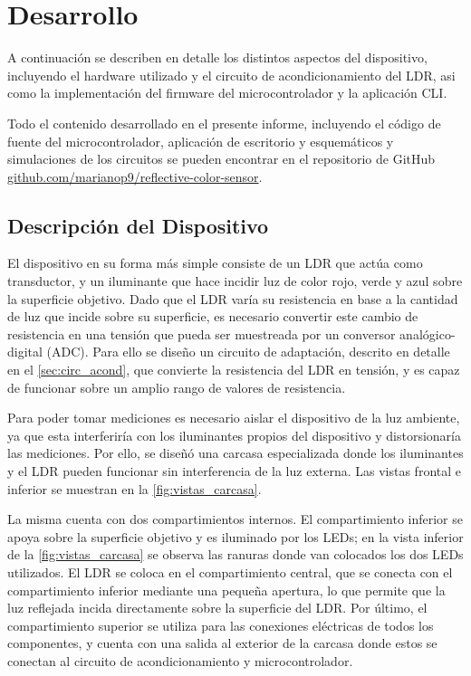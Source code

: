\documentclass[12pt,a4paper,fleqn]{article}
\begin{document}
\section{Desarrollo}
A continuación se describen en detalle los distintos aspectos del dispositivo, incluyendo el hardware utilizado y el circuito de acondicionamiento del LDR, asi como la implementación del firmware del microcontrolador y la aplicación CLI\@.

Todo el contenido desarrollado en el presente informe, incluyendo el código de fuente del microcontrolador, aplicación de escritorio y esquemáticos y simulaciones de los circuitos se pueden encontrar en el repositorio de GitHub \href{https://github.com/marianop9/reflective-color-sensor}{github.com/marianop9/reflective-color-sensor}.

\subsection{Descripción del Dispositivo}

El dispositivo en su forma más simple consiste de un LDR que actúa como transductor, y un iluminante que hace incidir luz de color rojo, verde y azul sobre la superficie objetivo. Dado que el LDR varía su resistencia en base a la cantidad de luz que incide sobre su superficie, es necesario convertir este cambio de resistencia en una tensión que pueda ser muestreada por un conversor analógico-digital (ADC). Para ello se diseño un circuito de adaptación, descrito en detalle en el \cref{sec:circ_acond}, que convierte la resistencia del LDR en tensión, y es capaz de funcionar sobre un amplio rango de valores de resistencia.

Para poder tomar mediciones es necesario aislar el dispositivo de la luz ambiente, ya que esta interferiría con los iluminantes propios del dispositivo y distorsionaría las mediciones. Por ello, se diseñó una carcasa especializada donde los iluminantes y el LDR pueden funcionar sin interferencia de la luz externa. Las vistas frontal e inferior se muestran en la \cref{fig:vistas_carcasa}.

La misma cuenta con dos compartimientos internos. El compartimiento inferior se apoya sobre la superficie objetivo y es iluminado por los LEDs; en la vista inferior de la \cref{fig:vistas_carcasa} se observa las ranuras donde van colocados los dos LEDs utilizados. El LDR se coloca en el compartimiento central, que se conecta con el compartimiento inferior mediante una pequeña apertura, lo que permite que la luz reflejada incida directamente sobre la superficie del LDR. Por último, el compartimiento superior se utiliza para las conexiones eléctricas de todos los componentes, y cuenta con una salida al exterior de la carcasa donde estos se conectan al circuito de acondicionamiento y microcontrolador.
\end{document}
